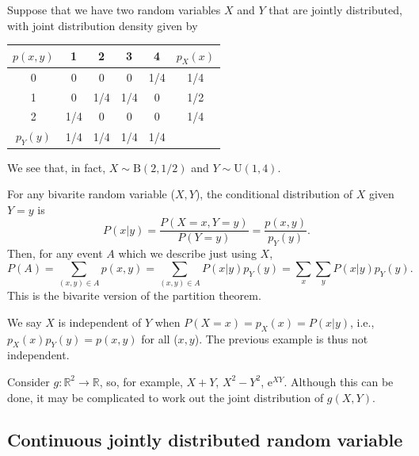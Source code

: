 \documentclass[letter-paper]{tufte-book}
\newenvironment{example}[1][Example]{\begin{trivlist}
\item[\hskip \labelsep {\bfseries #1}]}{\end{trivlist}}
\newcommand{\ex}{\mathrm{e}}
\begin{document}
\begin{example}
  Suppose that we have two random variables $X$ and $Y$ that are jointly
  distributed, with joint distribution density given by
  \begin{center}
    \begin{tabular}{c|cccc|c}
      $p(x,y)$ & 1 & 2 & 3 & 4 & $p_X(x)$\\
      \hline
      0 & 0 & 0 & 0 & 1/4 & 1/4\\
      1 & 0 & 1/4 & 1/4 & 0 & 1/2\\
      2 & 1/4 & 0 & 0 & 0 & 1/4\\
      \hline
      $p_Y(y)$ & 1/4 & 1/4 & 1/4 & 1/4 & 
    \end{tabular}
  \end{center}
  We see that, in fact, $X\sim\mbox{B}(2,1/2)$ and $Y\sim\mbox{U}(1,4)$.
\end{example}

For any bivarite random variable ($X,Y$), the conditional distribution of $X$
given $Y=y$ is
\begin{equation*}
  P(x|y) = \frac{P(X=x, Y=y)}{P(Y=y)} = \frac{p(x,y)}{p_Y(y)}.
\end{equation*}
Then, for any event $A$ which we describe just using $X$,
\begin{equation*}
  P(A) = \sum_{(x,y)\in A}p(x,y) = \sum_{(x,y)\in A}P(x|y)p_Y(y)
  =\sum_x \sum_y P(x|y)p_Y(y).
\end{equation*}
This is the bivarite version of the partition theorem.

We say $X$ is independent of $Y$ when $P(X=x) = p_X(x) = P(x|y)$, i.e., $p_X(x)
p_Y(y) = p(x,y)$ for all ($x,y$). The previous example is thus not independent.

Consider $g:\mathbb{R}^2\to\mathbb{R}$, so, for example, $X + Y$, $X^2 - Y^2$,
$\ex^{XY}$. Although this can be done, it may be complicated to work out the
joint distribution of $g(X,Y)$.


\subsection{Continuous jointly distributed random variable}
\end{document}
